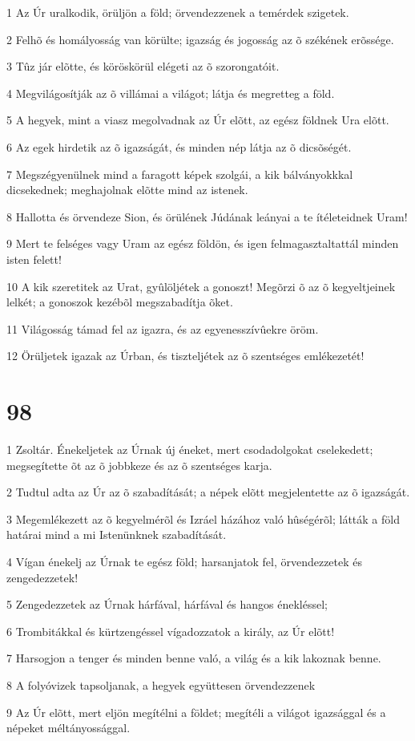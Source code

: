 \par 1 Az Úr uralkodik, örüljön a föld; örvendezzenek a temérdek szigetek.
\par 2 Felhõ és homályosság van körülte; igazság és jogosság az õ székének erõssége.
\par 3 Tûz jár elõtte, és köröskörül elégeti az õ szorongatóit.
\par 4 Megvilágosítják az õ villámai a világot; látja és megretteg a föld.
\par 5 A hegyek, mint a viasz megolvadnak az Úr elõtt, az egész földnek Ura elõtt.
\par 6 Az egek hirdetik az õ igazságát, és minden nép látja az õ dicsõségét.
\par 7 Megszégyenülnek mind a faragott képek szolgái, a kik bálványokkkal dicsekednek; meghajolnak elõtte mind az istenek.
\par 8 Hallotta és örvendeze Sion, és örülének Júdának leányai a te ítéleteidnek Uram!
\par 9 Mert te felséges vagy Uram az egész földön, és igen felmagasztaltattál minden isten felett!
\par 10 A kik szeretitek az Urat, gyûlöljétek a gonoszt! Megõrzi õ az õ kegyeltjeinek lelkét; a gonoszok kezébõl megszabadítja õket.
\par 11 Világosság támad fel az igazra, és az egyenesszívûekre öröm.
\par 12 Örüljetek igazak az Úrban, és tiszteljétek az õ szentséges emlékezetét!

\chapter{98}

\par 1 Zsoltár. Énekeljetek az Úrnak új éneket, mert csodadolgokat cselekedett; megsegítette õt az õ jobbkeze és az õ szentséges karja.
\par 2 Tudtul adta az Úr az õ szabadítását; a népek elõtt megjelentette az õ igazságát.
\par 3 Megemlékezett az õ kegyelmérõl és Izráel házához való hûségérõl; látták a föld határai mind a mi Istenünknek szabadítását.
\par 4 Vígan énekelj az Úrnak te egész föld; harsanjatok fel, örvendezzetek és zengedezzetek!
\par 5 Zengedezzetek az Úrnak hárfával, hárfával és hangos énekléssel;
\par 6 Trombitákkal és kürtzengéssel vígadozzatok a király, az Úr elõtt!
\par 7 Harsogjon a tenger és minden benne való, a világ és a kik lakoznak benne.
\par 8 A folyóvizek tapsoljanak, a hegyek együttesen örvendezzenek
\par 9 Az Úr elõtt, mert eljön megítélni a földet; megítéli a világot igazsággal és a népeket méltányossággal.

